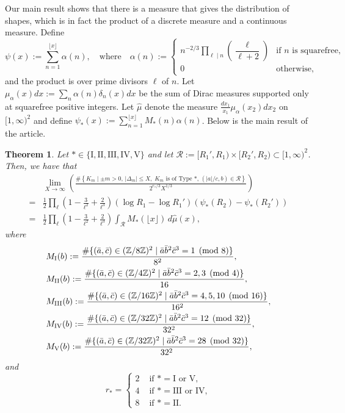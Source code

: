\documentclass[table]{amsart}
\newtheorem{theorem}{Theorem}[section]
\newcommand{\Z}{\mathbb{Z}}
\numberwithin{equation}{section}
\begin{document}
\par Our main result shows that there is a measure that gives the distribution of shapes, which is in fact the product of a discrete measure and a continuous measure. Define
$$
\psi(x) := \sum_{n = 1}^{\lfloor x \rfloor} \alpha(n),
\quad \text{where} \quad
\alpha(n) := \begin{cases}
n^{-2/3} \displaystyle\prod_{\ell \mid n} \left( \dfrac{\ell}{\ell + 2} \right) & \text{if } n \text{ is squarefree}, \\
0 & \text{otherwise},
\end{cases}
$$
\noindent and the product is over prime divisors $\ell$ of $n$. Let $\mu_\alpha(x) dx:=\sum_{n} \alpha(n)\delta_n(x)dx$ be the sum of Dirac measures supported only at squarefree positive integers. Let $\hat{\mu}$ denote the measure $\frac{dx_1}{x_1} \mu_\alpha(x_2)dx_2$ on $[1, \infty)^2$ and define $\psi_{\ast}(x):=\sum_{n=1}^{\lfloor x \rfloor} M_{\ast}(n) \alpha(n)$. Below is the main result of the article. \begin{theorem}\label{Main theorem}
Let $* \in \{\mathrm{I},\mathrm{II}, \mathrm{III}, \mathrm{IV}, \mathrm{V}\}$ and let $\mathcal{R}:=[R_1', R_1)\times [R_2', R_2)
\subset [1, \infty)^2$. Then, we have that
\[
\begin{split}& \lim_{X \to \infty}
\left(
\frac{
\#\left\{ K_m \mid \pm m>0,\, |\Delta_m| \leq X,\; K_m \text{ is of Type } \ast,\, (|a|/c,b) \in \mathcal{R} \right\}
}{
2^{r_*/3} X^{1/3}
}
\right)\\
= &
\frac{1}{2} \prod_\ell\left(1-\frac{3}{\ell^2}+\frac{2}{\ell^3}\right)(\log R_1 - \log R_1') \left( \psi_{*}(R_2) - \psi_{*}(R_2') \right) \\
= &
\frac{1}{2} \prod_\ell\left(1-\frac{3}{\ell^2}+\frac{2}{\ell^3}\right)\int_{\mathcal{R}} M_{*}(\lfloor x \rfloor) \, d\hat{\mu}(x),
\end{split}
\]
where
\[\begin{split}
& M_{\rm{I}}(b):=\frac{\# \{(\bar{a}, \bar{c})\in (\Z/8\Z)^2\mid \bar{a}\bar{b}^2\bar{c}^3=1\pmod{8}\}}{8^2}, \\
& M_{\rm{II}}(b):= \frac{\# \{(\bar{a}, \bar{c})\in (\Z/4\Z)^2\mid \bar{a}\bar{b}^2\bar{c}^3=2,3\pmod{4}\}}{16}, \\
& M_{\rm{III}}(b):=\frac{\# \{(\bar{a}, \bar{c})\in (\Z/16\Z)^2\mid \bar{a}\bar{b}^2\bar{c}^3=4, 5, 10\pmod{16}\}}{16^2}, \\
& M_{\rm{IV}}(b):=\frac{\# \{(\bar{a}, \bar{c})\in (\Z/32\Z)^2\mid \bar{a}\bar{b}^2\bar{c}^3=12\pmod{32}\}}{32^2}, \\
& M_{\rm{V}}(b):=\frac{\# \{(\bar{a}, \bar{c})\in (\Z/32\Z)^2\mid \bar{a}\bar{b}^2\bar{c}^3=28\pmod{32}\}}{32^2},
\end{split}\]
and
\[r_\ast=\begin{cases}
    2 & \text{ if }\ast = \mathrm{I}\text{ or }\mathrm{V},\\
    4& \text{ if }\ast = \mathrm{III}\text{ or }\mathrm{IV},\\
    8 & \text{ if }\ast=\mathrm{II}.
\end{cases}\]

\end{theorem}
\end{document}
